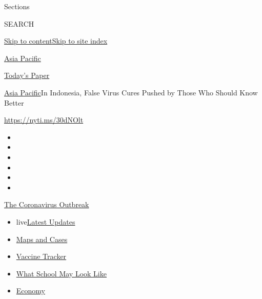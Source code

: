 Sections

SEARCH

\protect\hyperlink{site-content}{Skip to
content}\protect\hyperlink{site-index}{Skip to site index}

\href{https://www.nytimes3xbfgragh.onion/section/world/asia}{Asia
Pacific}

\href{https://myaccount.nytimes3xbfgragh.onion/auth/login?response_type=cookie\&client_id=vi}{}

\href{https://www.nytimes3xbfgragh.onion/section/todayspaper}{Today's
Paper}

\href{/section/world/asia}{Asia Pacific}\textbar{}In Indonesia, False
Virus Cures Pushed by Those Who Should Know Better

\url{https://nyti.ms/30dNOlt}

\begin{itemize}
\item
\item
\item
\item
\item
\item
\end{itemize}

\href{https://www.nytimes3xbfgragh.onion/news-event/coronavirus?action=click\&pgtype=Article\&state=default\&region=TOP_BANNER\&context=storylines_menu}{The
Coronavirus Outbreak}

\begin{itemize}
\tightlist
\item
  live\href{https://www.nytimes3xbfgragh.onion/2020/08/01/world/coronavirus-covid-19.html?action=click\&pgtype=Article\&state=default\&region=TOP_BANNER\&context=storylines_menu}{Latest
  Updates}
\item
  \href{https://www.nytimes3xbfgragh.onion/interactive/2020/us/coronavirus-us-cases.html?action=click\&pgtype=Article\&state=default\&region=TOP_BANNER\&context=storylines_menu}{Maps
  and Cases}
\item
  \href{https://www.nytimes3xbfgragh.onion/interactive/2020/science/coronavirus-vaccine-tracker.html?action=click\&pgtype=Article\&state=default\&region=TOP_BANNER\&context=storylines_menu}{Vaccine
  Tracker}
\item
  \href{https://www.nytimes3xbfgragh.onion/interactive/2020/07/29/us/schools-reopening-coronavirus.html?action=click\&pgtype=Article\&state=default\&region=TOP_BANNER\&context=storylines_menu}{What
  School May Look Like}
\item
  \href{https://www.nytimes3xbfgragh.onion/live/2020/07/31/business/stock-market-today-coronavirus?action=click\&pgtype=Article\&state=default\&region=TOP_BANNER\&context=storylines_menu}{Economy}
\end{itemize}

